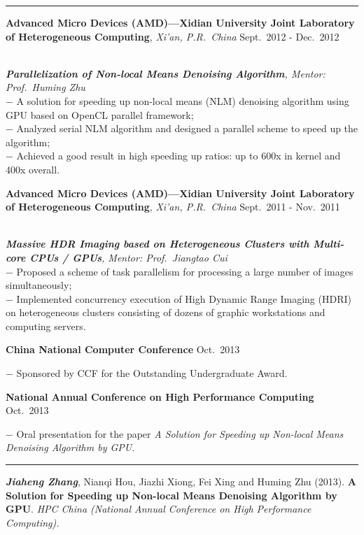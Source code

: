 \documentclass[a4paper,10pt]{article}
\newcommand{\shadedsection}[1]{
    \setlength{\fboxsep}{0pt}
    \colorbox{shadecolor}{%
        \begin{minipage}{\linewidth}%
            \vspace{0.2em}%
            #1%
        \end{minipage}%
    }
}
\newenvironment{rSection}[1]{ %
  \medskip
  \hspace{-1.5em}{\color{Blue}\MakeUppercase{\large \bf {#1}}} %
  \vspace{-0.2em}
  \medskip
  \hrule %
  \begin{list}{}{ %
    \setlength{\leftmargin}{1.5em} %
  }
\setlength{\itemsep}{1pt}
  \item[]
}{
  \end{list}
}
\newcommand{\detail}[1]{{$-$ {#1}}}
\newcommand{\period}[3]{\normalsize {#1} \hfill {#2} - {#3}}
\newcommand{\conference}[2]{\shadedsection{{\bf #1} \hfill {#2}}}
\begin{document}
\vspace{-0.5em}

\begin{rSection}{Academic Experience}
  \vspace{-1.5em}
  \item
    \shadedsection{\period{{\bf Advanced Micro Devices (AMD)---Xidian University Joint Laboratory of Heterogeneous Computing}, {\em Xi'an, P.R.~China}}{Sept.~2012}{Dec.~2012}}\\
    {\em {\bf Parallelization of Non-local Means Denoising Algorithm}, Mentor: Prof.~Huming Zhu}\\
    \detail{A solution for speeding up non-local means (NLM) denoising algorithm using GPU based on OpenCL parallel framework;}\\
    \detail{Analyzed serial NLM algorithm and designed a parallel scheme to speed up the algorithm;}\\
    \detail{Achieved a good result in high speeding up ratios: up to 600x in kernel and 400x overall.}
  \item
    \shadedsection{\period{{\bf Advanced Micro Devices (AMD)---Xidian University Joint Laboratory of Heterogeneous Computing}, {\em Xi'an, P.R.~China}}{Sept.~2011}{Nov.~2011}}\\
    {\em {\bf Massive HDR Imaging based on Heterogeneous Clusters with Multi-core CPUs / GPUs}, Mentor: Prof.~Jiangtao Cui}\\
    \detail{Proposed a scheme of task parallelism for processing a large number of images simultaneously;}\\
    \detail{Implemented concurrency execution of High Dynamic Range Imaging (HDRI) on heterogeneous clusters consisting of dozens of graphic workstations and computing servers.}\\
    \conference{China National Computer Conference}{Oct.~2013}
    \detail{Sponsored by CCF for the Outstanding Undergraduate Award.}\\
    \conference{National Annual Conference on High Performance Computing}{Oct.~2013}
    \detail{Oral presentation for the paper {\em A Solution for Speeding up Non-local Means Denoising Algorithm by GPU}.}
\end{rSection}

\vspace{-0.5em}

\begin{rSection}{Publication}
  \vspace{-1.5em}
    \item
      {\bf \em Jiaheng Zhang}, Nianqi Hou, Jiazhi Xiong, Fei Xing and Huming Zhu (2013). {\bf A Solution for Speeding up Non-local Means Denoising Algorithm by GPU}. {\em HPC China (National Annual Conference on High Performance Computing).}
\end{rSection}
\end{document}

